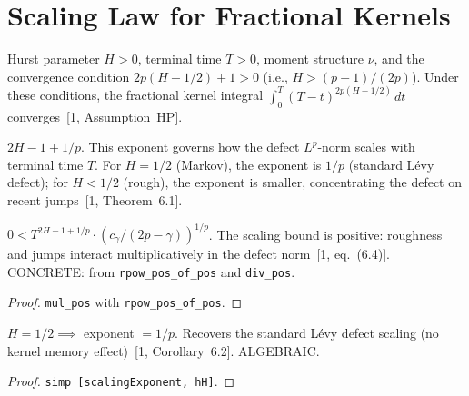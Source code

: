 \section{Scaling Law for Fractional Kernels}

\begin{defn}\label{def:DefectScalingData}
\leanok
{}
Hurst parameter $H > 0$, terminal time $T > 0$, moment structure $\nu$, and the convergence condition $2p(H - 1/2) + 1 > 0$ (i.e., $H > (p-1)/(2p)$). Under these conditions, the fractional kernel integral $\int_0^T (T-t)^{2p(H-1/2)}\,dt$ converges~[1, Assumption~HP].
\end{defn}

\begin{defn}\label{def:scalingExponent}
\leanok
{}
$2H - 1 + 1/p$. This exponent governs how the defect $L^p$-norm scales with terminal time $T$. For $H = 1/2$ (Markov), the exponent is $1/p$ (standard L\'evy defect); for $H < 1/2$ (rough), the exponent is smaller, concentrating the defect on recent jumps~[1, Theorem~6.1].
\end{defn}

\begin{theorem}\label{thm:scalingBound_pos}
\leanok
{}
$0 < T^{2H-1+1/p} \cdot (c_\gamma/(2p-\gamma))^{1/p}$. The scaling bound is positive: roughness and jumps interact multiplicatively in the defect norm~[1, eq.~(6.4)]. CONCRETE: from \texttt{rpow\_pos\_of\_pos} and \texttt{div\_pos}.
\end{theorem}
\begin{proof}\leanok \texttt{mul\_pos} with \texttt{rpow\_pos\_of\_pos}.\end{proof}

\begin{theorem}\label{thm:markov_scaling_exponent}
\leanok
{}
$H = 1/2 \implies$ exponent $= 1/p$. Recovers the standard L\'evy defect scaling (no kernel memory effect)~[1, Corollary~6.2]. ALGEBRAIC.
\end{theorem}
\begin{proof}\leanok \texttt{simp [scalingExponent, hH]}.\end{proof}

